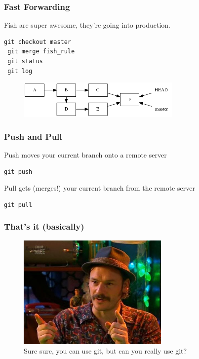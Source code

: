\documentclass{beamer}
\begin{document}
\begin{frame}[fragile]
\frametitle{Fast Forwarding}

Fish are super awesome, they're going into production.

\vspace{1em}

\begin{lstlisting}[frame=single]
 git checkout master
 git merge fish_rule
 git status
 git log
\end{lstlisting}

\begin{figure}[p]
  \centering
  \includegraphics[height=5em]{fast_forward.png}
\end{figure}

\end{frame}

\begin{frame}[fragile]
\frametitle{Push and Pull}

Push moves your current branch onto a remote server

\vspace{1em}

\begin{lstlisting}[frame=single]
  git push 
\end{lstlisting}

\vspace{1em}

Pull gets (merges!) your current branch from the remote server

\vspace{1em}

\begin{lstlisting}[frame=single]
  git pull 
\end{lstlisting}

\end{frame}

\begin{frame}

\frametitle{That's it (basically)}

\begin{figure}[p]
  \centering
  \includegraphics[height=15em]{howard.jpg}
  \caption{Sure sure, you can use git, but can you really use git?}
\end{figure}

\end{frame}
\end{document}
